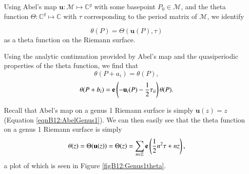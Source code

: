 \begin{definition}
    Using Abel's map $\mathbf{u} : \mathcal M \mapsto \mathbb C^g$ with some basepoint $P_0 \in \mathcal M$, and the theta function $\Theta : \mathbb C^g \mapsto \mathbb C$ with $\tau$ corresponding to the period matrix of $\mathcal M$, we identify

    \begin{equation}
        \theta(P) = \Theta(\mathbf{u}(P),\tau)
    \end{equation}
    as a theta function on the Riemann surface.
\end{definition}

\begin{lemma}
    Using the analytic continuation provided by Abel's map and the quasiperiodic properties of the theta function, we find that
    \begin{equation}
        \theta(P+a_i) = \theta(P),
    \end{equation}
    \begin{equation}
        \theta(P+b_i) = \mathbf{e}\left(-\mathbf{u}_i(P)-\frac{1}{2}\tau_{ii}\right)\theta(P).
    \end{equation}
\end{lemma}

Recall that Abel's map on a genus 1 Riemann surface is simply $\mathbf{u}(z)=z$ (Equation \ref{eqnB12:AbelGenus1}). We can then easily see that the theta function on a genus 1 Riemann surface is simply
\begin{equation}
    \theta(z) = \Theta(\mathbf{u}(z)) = \Theta(z) = \sum_{n \in \mathbb Z} \mathbf{e}\left(\frac{1}{2}n^2 \tau + n z\right),
\end{equation}
a plot of which is seen in Figure \ref{figB12:Genus1theta}.

